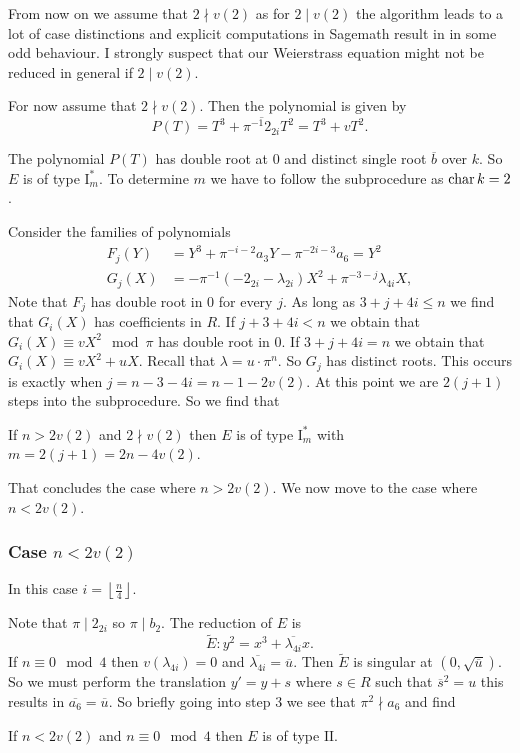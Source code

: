 From now on we assume that $2\nmid v(2)$ as for $2 \mid v(2) $ the algorithm leads to a lot of case distinctions and explicit computations in Sagemath result in in some odd behaviour. 
I strongly suspect that our Weierstrass equation might not be reduced in general if $2\mid v(2) $. 

For now assume that $2 \nmid v(2)$. 
Then the polynomial is given by \[
	P(T) = T^3 + \overline{\pi^{-1} 2_{2i}} T^2 = T^3 + vT^2
.\] 

The polynomial  $P(T)$ has double root at $0$ and distinct single root $\overline{b}$ over $k$. 
So $E$ is of type $\mathrm I_m^*$. 
To determine $m$ we have to follow the subprocedure as $\operatorname{char} k = 2$. 

Consider the families of polynomials 
\begin{align*}
	F_j(Y) &= Y^3 + \pi^{-i-2} a_3 Y - \pi^{-2i-3} a_6 = Y^2 \\
	G_j(X) &= -\pi^{-1}(-2_{2i} - \lambda_{2i}) X^2 + \pi^{-3 - j}\lambda_{4i} X
,\end{align*}
Note that $F_j$ has double root in $0$ for every $j$.  
As long as $3 + j + 4i \le n$ we find that $G_i(X)$ has coefficients in $R$. 
If $j + 3 + 4i <  n$ we obtain that $G_i(X) \equiv v X^2 \mod \pi$ has double root in $0$. 
If $3 + j + 4i = n$ we obtain that $G_i(X) \equiv v X^2 + uX$. Recall that $\lambda = u \cdot \pi^{n}$. 
So $G_j$ has distinct roots. 
This occurs is exactly when $j = n - 3 - 4i = n - 1 - 2v(2)$. 
At this point we are $2(j + 1)$ steps into the subprocedure. 
So we find that 
\begin{tateconclusion}
	If $n > 2v(2)$ and $2\nmid v(2)$ then $E$ is of type $\mathrm I_m^*$ with  $m = 2(j + 1) = 2n - 4v(2)$.
\end{tateconclusion}


That concludes the case where $n > 2v(2)$. 
We now move to the case where $n < 2v(2)$. 

\subsubsection{Case $n < 2v(2)$} \label{sec:case_n_<_2v2}

In this case $i = \left\lfloor \frac{n}{4} \right\rfloor$.

Note that $\pi\mid 2_{2i}$ so $\pi\mid b_2$. 
The reduction of $E$ is 
\[
\tilde E: y^2 = x^3 +  \overline{\lambda_{4i}}x
.\] 
If $n \equiv 0 \mod 4$ then $v(\lambda_{4i}) = 0$ and $\overline{\lambda_{4i}} = \overline{u}$. 
Then $\tilde E$ is singular at $(0, \sqrt{\overline{u}})$. 
So we must perform the translation $y' = y + s $ where $s \in R$ such that $\overline{s}^2 = u$ this results in $\overline{a_6} = \overline{u}$.
So briefly going into step $3$ we see that $\pi^2 \nmid a_6$ and find 
\begin{tateconclusion}
	If $n < 2v(2)$ and $n \equiv 0 \mod 4$ then $E$ is of type $\mathrm{II}$. 
\end{tateconclusion}

